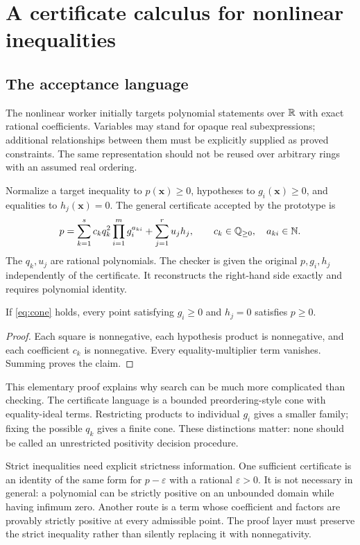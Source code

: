\section{A certificate calculus for nonlinear inequalities}

\subsection{The acceptance language}

The nonlinear worker initially targets polynomial statements over $\mathbb{R}$ with exact rational coefficients. Variables may stand for opaque real subexpressions; additional relationships between them must be explicitly supplied as proved constraints. The same representation should not be reused over arbitrary rings with an assumed real ordering.

Normalize a target inequality to $p(\bm x)\ge0$, hypotheses to $g_i(\bm x)\ge0$, and equalities to $h_j(\bm x)=0$. The general certificate accepted by the prototype is
\begin{equation}
 p=\sum_{k=1}^{s}c_k q_k^2\prod_{i=1}^{m}g_i^{a_{ki}}
        +\sum_{j=1}^{r}u_jh_j,
 \qquad c_k\in\mathbb{Q}_{\ge0},\quad a_{ki}\in\mathbb{N}.
 \label{eq:cone}
\end{equation}
The $q_k,u_j$ are rational polynomials. The checker is given the original $p,g_i,h_j$ independently of the certificate. It reconstructs the right-hand side exactly and requires polynomial identity.

\begin{proposition}
If \eqref{eq:cone} holds, every point satisfying $g_i\ge0$ and $h_j=0$ satisfies $p\ge0$.
\end{proposition}
\begin{proof}
Each square is nonnegative, each hypothesis product is nonnegative, and each coefficient $c_k$ is nonnegative. Every equality-multiplier term vanishes. Summing proves the claim.
\end{proof}

This elementary proof explains why search can be much more complicated than checking. The certificate language is a bounded preordering-style cone with equality-ideal terms. Restricting products to individual $g_i$ gives a smaller family; fixing the possible $q_k$ gives a finite cone. These distinctions matter: none should be called an unrestricted positivity decision procedure.

Strict inequalities need explicit strictness information. One sufficient certificate is an identity of the same form for $p-\varepsilon$ with a rational $\varepsilon>0$. It is not necessary in general: a polynomial can be strictly positive on an unbounded domain while having infimum zero. Another route is a term whose coefficient and factors are provably strictly positive at every admissible point. The proof layer must preserve the strict inequality rather than silently replacing it with nonnegativity.

